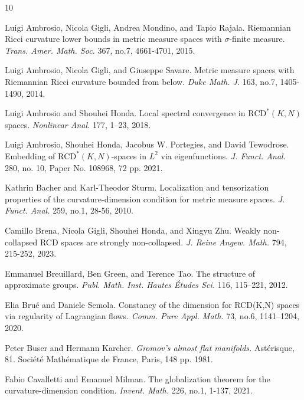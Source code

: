 \documentclass[12pt]{amsart}
\theoremstyle{definition}
\numberwithin{equation}{section}
\newcommand{\RCD}{\text{RCD}}
\begin{document}
\begin{thebibliography}{10}



 Luigi Ambrosio, Nicola Gigli, Andrea Mondino, and Tapio Rajala.
\newblock Riemannian Ricci curvature lower bounds in metric measure spaces with $\sigma$-finite measure. {\em Trans. Amer. Math. Soc.} 367, no.7, 4661-4701, 2015.

Luigi Ambrosio, Nicola Gigli, and Giuseppe Savare.  
\newblock Metric measure spaces with Riemannian Ricci curvature bounded from below. {\em Duke Math. J.} 163, no.7, 1405-1490, 2014.


Luigi Ambrosio and Shouhei Honda.
\newblock Local spectral convergence in $\RCD^*(K, N)$ spaces. {\em Nonlinear Anal.} 177, 1--23, 2018.

Luigi Ambrosio, Shouhei Honda, Jacobus W. Portegies, and David Tewodrose.
\newblock Embedding of $\RCD^*(K, N)$-spaces in $L^2$ via eigenfunctions. {\em  J. Funct. Anal. }280, no. 10, Paper No. 108968, 72 pp. 2021.


Kathrin Bacher and Karl-Theodor Sturm.
\newblock Localization and tensorization properties of the curvature-dimension condition for metric measure spaces. {\em  J. Funct. Anal. }259, no.1, 28-56, 2010.


Camillo Brena, Nicola Gigli, Shouhei Honda, and Xingyu Zhu.  
\newblock Weakly non-collapsed RCD spaces are strongly non-collapsed. {\em J. Reine Angew. Math. }794, 215-252, 2023.

Emmanuel Breuillard, Ben Green, and Terence Tao.
\newblock The structure of approximate groups. {\em Publ. Math. Inst. Hautes \'Etudes Sci. }116, 115--221, 2012.

Elia Bru\'e and Daniele Semola.
\newblock Constancy of the dimension for RCD(K,N) spaces via regularity of Lagrangian flows. {\em Comm. Pure Appl. Math. }73, no.6, 1141–1204, 2020.

Peter Buser and  Hermann Karcher.  
{\em Gromov's almost flat manifolds.} Ast\'erisque, 81.
Soci\'et\'e Math\'ematique de France, Paris,  148 pp. 1981.

Fabio Cavalletti and Emanuel Milman.
\newblock The globalization theorem for the curvature-dimension condition. {\em Invent. Math.} 226, no.1, 1-137, 2021.



\end{thebibliography}
\end{document}
